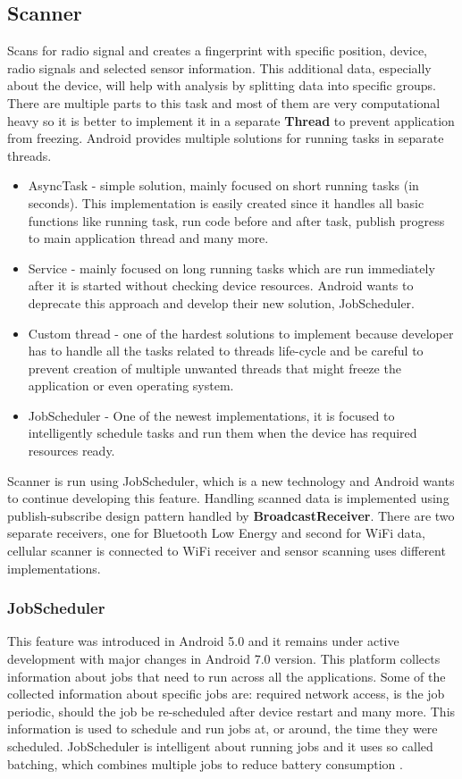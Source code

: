 \subsection{Scanner}\label{subsec:Scanner}
Scans for radio signal and creates a fingerprint with specific position, device, radio signals and selected sensor information. This additional data, especially about the device, will help with analysis by splitting data into specific groups. There are multiple parts to this task and most of them are very computational heavy so it is better to implement it in a separate \textbf{Thread} to prevent application from freezing. Android provides multiple solutions for running tasks in separate threads.

\begin{itemize}
	\item AsyncTask - simple solution, mainly focused on short running tasks (in seconds). This implementation is easily created since it handles all basic functions like running task, run code before and after task, publish progress to main application thread and many more.
	\item Service - mainly focused on long running tasks which are run immediately after it is started without checking device resources. Android wants to deprecate this approach and develop their new solution, JobScheduler.
	\item Custom thread - one of the hardest solutions to implement because developer has to handle all the tasks related to threads life-cycle and be careful to prevent creation of multiple unwanted threads that might freeze the application or even operating system.
	\item JobScheduler - One of the newest implementations, it is focused to intelligently schedule tasks and run them when the device has required resources ready.
\end{itemize}

Scanner is run using JobScheduler, which is a new technology and Android wants to continue developing this feature. Handling scanned data is implemented using publish-subscribe design pattern handled by \textbf{BroadcastReceiver}. There are two separate receivers, one for Bluetooth Low Energy and second for WiFi data, cellular scanner is connected to WiFi receiver and sensor scanning uses different implementations.

\subsubsection{JobScheduler}\label{subsubsec:JobScheduler}
This feature was introduced in Android 5.0 and it remains under active development with major changes in Android 7.0 version. This platform collects information about jobs that need to run across all the applications. Some of the collected information about specific jobs are: required network access, is the job periodic, should the job be re-scheduled after device restart and many more. This information is used to schedule and run jobs at, or around, the time they were scheduled. JobScheduler is intelligent about running jobs and it uses so called batching, which combines multiple jobs to reduce battery consumption \cite{AD, SOTAJS}.

